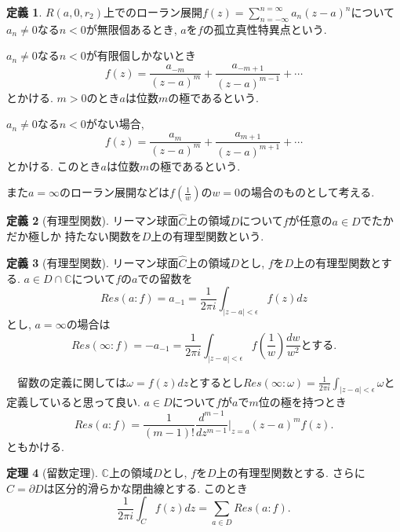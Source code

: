 \documentclass[dvipdfmx,a4paper,11pt]{article}
\newcommand{\C}{\mathbb{C}}
\theoremstyle{definition}
\newtheorem{thm}{定理}
\newtheorem{dfn}[thm]{定義}
\newcommand{\drv}[2]{\frac{d #1}{d#2}}
\begin{document}
\begin{tcolorbox}[
    colback = white,
    colframe = green!35!black,
    fonttitle = \bfseries,
    breakable = true]
    \begin{dfn}
$R(a,0,r_2)$上でのローラン展開$f(z) = \sum_{n=-\infty}^{n=\infty} a_n (z - a)^{n}$について$a_n \neq 0$なる$n <0$が無限個あるとき, $a$を$f$の孤立真性特異点という. 

$a_n \neq 0$なる$n<0$が有限個しかないとき
$$
f(z) = \frac{a_{-m}}{(z - a)^{m}} + \frac{a_{-m+1}}{(z - a)^{m-1}} + \cdots
$$
とかける. $m>0$のとき$a$は位数$m$の極であるという. 

$a_n \neq 0$なる$n<0$がない場合, 
$$
f(z) = \frac{a_{m}}{(z - a)^{m}} + \frac{a_{m+1}}{(z - a)^{m+1}} + \cdots
$$
とかける. このとき$a$は位数$m$の極であるという. 

また$a = \infty$のローラン展開などは$f(\frac{1}{w})$の$w=0$の場合のものとして考える.
    \end{dfn}
    
\end{tcolorbox} 
\begin{tcolorbox}[
    colback = white,
    colframe = green!35!black,
    fonttitle = \bfseries,
    breakable = true]
    \begin{dfn}[有理型関数]
リーマン球面$\hat{C}$上の領域$D$について$f$が任意の$a \in D$でたかだか極しか
持たない関数を$D$上の有理型関数という. 
    \end{dfn}
\end{tcolorbox} 

\begin{tcolorbox}[
    colback = white,
    colframe = green!35!black,
    fonttitle = \bfseries,
    breakable = true]
    \begin{dfn}[有理型関数]
リーマン球面$\hat{C}$上の領域$D$とし, $f$を$D$上の有理型関数とする. 
$a \in D \cap \C$について$f$の$a$での留数を
$$
Res(a: f) = a_{-1} = \frac{1}{2 \pi i}\int_{|z-a|< \epsilon} f(z) dz
$$
とし, $a=\infty $の場合は
$$
Res(\infty: f) = -a_{-1} = \frac{1}{2 \pi i}\int_{|z-a|< \epsilon} f(\frac{1}{w}) \frac{dw}{w^2}  \text{とする.}
$$
    \end{dfn}
\end{tcolorbox} 
　留数の定義に関しては$\omega = f(z) dz$とするとし$Res(\infty: \omega)= \frac{1}{2 \pi i}\int_{|z-a|< \epsilon} \omega$と定義していると思って良い.
$a \in D $について$f$が$a$で$m$位の極を持つとき
    $$
    Res(a : f) = \frac{1}{(m-1)!}\drv{^{m-1}}{z^{m-1}}|_{z=a} (z - a)^m f(z) .
    $$
    ともかける.
\begin{tcolorbox}[
    colback = white,
    colframe = green!35!black,
    fonttitle = \bfseries,
    breakable = true]
    \begin{thm}[留数定理]
    $\C$上の領域$D$とし, $f$を$D$上の有理型関数とする. さらに$C = \partial D$は区分的滑らかな閉曲線とする.
    このとき
    $$
    \frac{1}{2 \pi i}\int_{C} f(z) dz = \sum_{a \in D} Res(a : f).
     $$
    \end{thm}
\end{tcolorbox} 
\end{document}
